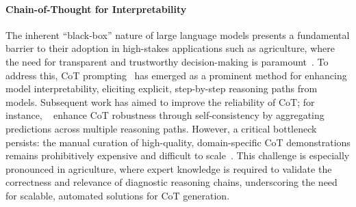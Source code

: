 \documentclass[11pt]{article}
\begin{document}
\paragraph{Chain-of-Thought for Interpretability}
The inherent ``black-box'' nature of large language models presents a fundamental barrier to their adoption in high-stakes applications such as agriculture, where the need for transparent and trustworthy decision-making is paramount~\cite{sun2022black,bommasani2021opportunities,martin2024xai}. To address this, CoT prompting~\cite{wei2022chain} has emerged as a prominent method for enhancing model interpretability, eliciting explicit, step-by-step reasoning paths from models. Subsequent work has aimed to improve the reliability of CoT; for instance, ~\citet{wang2022self} enhance CoT robustness through self-consistency by aggregating predictions across multiple reasoning paths. However, a critical bottleneck persists: the manual curation of high-quality, domain-specific CoT demonstrations remains prohibitively expensive and difficult to scale~\cite{wang2025beyond,lightman2023letsverifystepstep,kim2023cotcollectionimprovingzeroshot}. This challenge is especially pronounced in agriculture, where expert knowledge is required to validate the correctness and relevance of diagnostic reasoning chains, underscoring the need for scalable, automated solutions for CoT generation.

\end{document}

